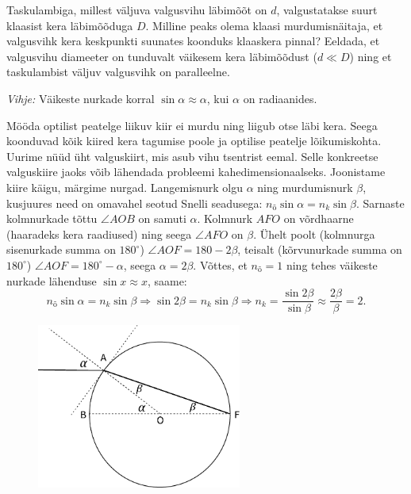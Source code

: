 \setAuthor{}

Taskulambiga, millest väljuva valgusvihu läbimõõt on $d$, valgustatakse suurt
klaasist kera läbimõõduga $D$. Milline peaks olema klaasi murdumisnäitaja, et
valgusvihk kera keskpunkti suunates koonduks klaaskera pinnal? Eeldada, et
valgusvihu diameeter on tunduvalt väikesem kera läbimõõdust ($d\ll D$) ning et
taskulambist väljuv valgusvihk on paralleelne.

\emph{Vihje:} Väikeste nurkade korral $\sin \alpha \approx \alpha$, kui $\alpha$
on radiaanides.


\hint

\solu
Mööda optilist peatelge liikuv kiir ei murdu ning liigub otse läbi kera. Seega koonduvad kõik kiired kera tagumise poole ja optilise peatelje lõikumiskohta. Uurime nüüd üht valguskiirt, mis asub vihu tsentrist eemal. Selle konkreetse valguskiire jaoks võib lähendada probleemi kahedimensionaalseks. Joonistame kiire käigu, märgime nurgad. Langemisnurk olgu $\alpha$ ning murdumisnurk $\beta$, kusjuures need on omavahel seotud Snelli seadusega: $n_{õ}\sin\alpha=n_{k}\sin\beta$. Sarnaste kolmnurkade tõttu $\angle AOB$ on samuti $\alpha$. Kolmnurk $AFO$ on võrdhaarne (haaradeks kera raadiused) ning seega $\angle AFO$ on $\beta$. Ühelt poolt (kolmnurga sisenurkade summa on $180^\circ$) $\angle AOF=180-2\beta$, teisalt (kõrvunurkade summa on $180^\circ$) $\angle AOF=180^\circ-\alpha$, seega $\alpha=2\beta$. Võttes, et $n_{õ}=1$ ning tehes väikeste nurkade lähenduse $\sin x \approx x$, saame:
$$n_{õ}\sin\alpha=n_{k}\sin\beta \Rightarrow \sin2\beta=n_{k}\sin\beta \Rightarrow n_k = \frac{\sin2\beta}{\sin\beta}\approx\frac{2\beta}{\beta}=2.$$
\begin{figure}[htbp!]
\centering
\includegraphics[width=0.6\textwidth]{2020-v3g-01-yl.pdf}
\end{figure}
\probend